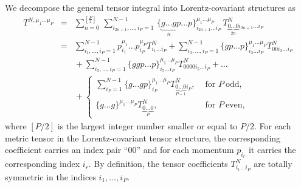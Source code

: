 \documentclass[preprint,sort&compress,12pt]{elsarticle}
\def\beqar{\begin{eqnarray}}
\def\eeqar{\end{eqnarray}}
\def\barr#1{\begin{array}{#1}}
\def\earr{\end{array}}
\def\nn{\nonumber}
\def\disp{\displaystyle}
\newcommand{\sst}{\scriptstyle}
\def\nl{\nonumber\\}
\begin{document}
We decompose the general tensor integral into Lorentz-covariant
structures as
\beqar
T^{N,\mu_1\ldots\mu_P} &=& 
\sum_{n=0}^{\left[\frac{P}{2}\right]} \,
\sum_{i_{2n+1},\ldots,i_P=1}^{N-1} \,
\{\underbrace{g \ldots g}_n  p\ldots p\}^{\mu_1\ldots\mu_P}_{i_{2n+1}\ldots i_P}
\, T^N_{\underbrace{\sst 0\ldots0}_{2n} i_{2n+1}\ldots i_{P}}
\nn\\
&=&\sum_{i_1,\ldots,i_P=1}^{N-1} 
p^{\mu_1}_{i_1}\ldots p^{\mu_P}_{i_P} T^N_{i_1\ldots i_P}
+ \sum_{i_3,\ldots,i_{P}=1}^{N-1} 
\{g p\ldots p\}^{\mu_1\ldots\mu_P}_{i_3\ldots i_P} T^N_{00i_3\ldots i_{P}}
\nl&&{}
+ \sum_{i_5,\ldots,i_{P}=1}^{N-1} 
\{g g p\ldots p\}^{\mu_1\ldots\mu_P}_{i_5 \ldots i_P} T^N_{0000i_5\ldots i_{P}}
+\ldots
\nl&&{}+
\left\{
\barr{cc}\disp
\sum_{i_{P}=1}^{N-1} 
\{g \ldots g p\}_{i_P}^{\mu_1\ldots\mu_P} 
T^N_{\underbrace{\sst0\ldots 0}_{P-1} i_{P}},
& \mbox{ for } P\ \mathrm{odd,} \\
\{g \ldots g \}^{\mu_1\ldots\mu_P} 
T^N_{\underbrace{\sst0\ldots 0}_{P}},
& \mbox{ for } P\ \mathrm{even,} 
\earr\right.\label{eq:decomp}
\eeqar
where $\left[{P}/{2}\right]$ is the largest integer number smaller 
or equal to ${P}/{2}$.  For each metric tensor in the Lorentz-covariant 
tensor structure, the corresponding coefficient carries an index pair ``00''
and for each momentum $p_{i_r}$ it carries the corresponding index
$i_r$. By definition, 
the tensor coefficients $T^N_{i_1\ldots i_P}$ are 
totally symmetric in the indices $i_1,\ldots,i_P$.
\end{document}
